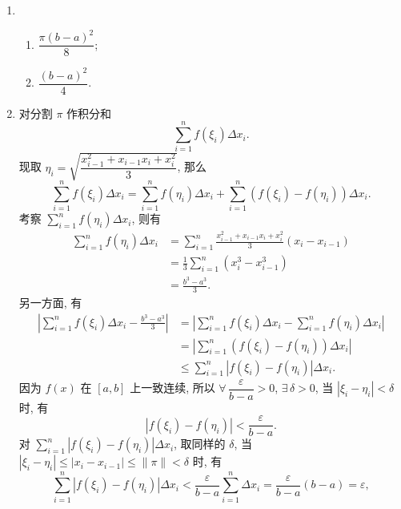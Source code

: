 \documentclass[a4paper, 11pt]{ctexart}
\begin{document}
\begin{enumerate}
    \item %
        \begin{enumerate}[(1)]
            \item %
                $\dfrac{\pi(b-a)^2}{8}$;
            \item %
                $\dfrac{(b-a)^2}{4}$.
        \end{enumerate}
    \item %
        对分割 $\pi$ 作积分和
        \[
            \sum_{i=1}^nf(\xi_i)\Delta x_i.
        \]
        现取 $\eta_i = \sqrt{\dfrac{x_{i-1}^2 + x_{i-1}x_i + x_i^2}{3}}$, 那么
        \[
            \sum_{i=1}^nf(\xi_i)\Delta x_i = \sum_{i=1}^nf(\eta_i)\Delta x_i + \sum_{i=1}^n(f(\xi_i) - f(\eta_i))\Delta x_i.   
        \]
        考察 $\sum\limits_{i=1}^nf(\eta_i)\Delta x_i$, 则有
        \begin{align*}
            \sum_{i=1}^nf(\eta_i)\Delta x_i &= \sum_{i=1}^n\frac{x_{i-1}^2 + x_{i-1}x_i + x_i^2}{3}(x_i - x_{i-1}) \\
                                            &= \frac13\sum_{i=1}^n(x_i^3 - x_{i-1}^3) \\
                                            &= \frac{b^3-a^3}{3}.    
        \end{align*}
        另一方面, 有
        \begin{align*}
            \left|\sum_{i=1}^nf(\xi_i)\Delta x_i - \frac{b^3-a^3}{3}\right| &= \left|\sum_{i=1}^nf(\xi_i)\Delta x_i - \sum_{i=1}^nf(\eta_i)\Delta x_i\right| \\
                                                                        &= \left|\sum_{i=1}^n(f(\xi_i) - f(\eta_i))\Delta x_i\right| \\
                                                                        &\leqslant \sum_{i=1}^n\left|f(\xi_i) - f(\eta_i)\right|\Delta x_i.    
        \end{align*}
        因为 $f(x)$ 在 $[a, b]$ 上一致连续, 所以 $\forall\,\dfrac{\varepsilon}{b-a} > 0$, $\exists\,\delta > 0$, 当 $|\xi_i - \eta_i| < \delta$ 时, 有
        \[
            \left|f(\xi_i) - f(\eta_i)\right| < \frac{\varepsilon}{b-a}.  
        \]
        对 $\sum\limits_{i=1}^n\left|f(\xi_i) - f(\eta_i)\right|\Delta x_i$, 取同样的 $\delta$, 当 $|\xi_i - \eta_i| \leqslant |x_i - x_{i-1}| \leqslant \|\pi\| < \delta$ 时, 有
        \[
            \sum_{i=1}^n\left|f(\xi_i) - f(\eta_i)\right|\Delta x_i < \frac{\varepsilon}{b-a}\sum_{i=1}^n\Delta x_i = \frac{\varepsilon}{b-a}(b-a) = \varepsilon,    
\]
\end{enumerate}
\end{document}
